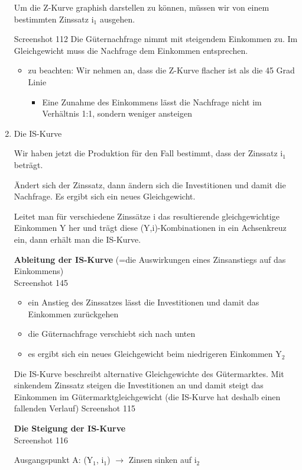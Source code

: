 \documentclass[11pt]{article}
\begin{document}
\begin{enumerate}
Um die Z-Kurve graphish darstellen zu können, müssen wir von einem bestimmten Zinssatz i\(_{\text{1}}\) ausgehen.

Screenshot 112
Die Güternachfrage nimmt mit steigendem Einkommen zu. Im Gleichgewicht muss die Nachfrage dem Einkommen entsprechen.
\begin{itemize}
\item zu beachten: Wir nehmen an, dass die Z-Kurve flacher ist als die 45 Grad Linie
\begin{itemize}
\item Eine Zunahme des Einkommens lässt die Nachfrage nicht im Verhältnis 1:1, sondern weniger ansteigen
\end{itemize}
\end{itemize}

\item Die IS-Kurve
\label{sec:orgd889f84}

Wir haben jetzt die Produktion für den Fall bestimmt, dass der Zinssatz i\(_{\text{1}}\) beträgt.

Ändert sich der Zinssatz, dann ändern sich die Investitionen und damit die Nachfrage. Es ergibt sich ein neues Gleichgewicht.

Leitet man für verschiedene Zinssätze i das resultierende gleichgewichtige Einkommen Y her und trägt diese (Y,i)-Kombinationen in ein Achsenkreuz ein, dann erhält man die IS-Kurve.

\textbf{Ableitung der IS-Kurve} (=die Auswirkungen eines Zinsanstiegs auf das Einkommens)\\
Screenshot 145
\begin{itemize}
\item ein Anstieg des Zinssatzes lässt die Investitionen und damit das Einkommen zurückgehen
\item die Güternachfrage verschiebt sich nach unten
\item es ergibt sich ein neues Gleichgewicht beim niedrigeren Einkommen Y\(_{\text{2}}\)
\end{itemize}

Die IS-Kurve beschreibt alternative Gleichgewichte des Gütermarktes. Mit sinkendem Zinssatz steigen die Investitionen an und damit steigt das Einkommen im Gütermarktgleichgewicht (die IS-Kurve hat deshalb einen fallenden Verlauf)
Screenshot 115

\textbf{Die Steigung der IS-Kurve}\\
Screenshot 116

Ausgangspunkt A: (Y\(_{\text{1}}\), i\(_{\text{1}}\)) \(\rightarrow\) Zinsen sinken auf i\(_{\text{2}}\) 


\end{enumerate}
\end{document}
